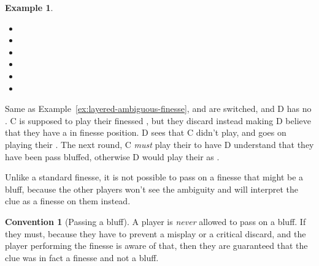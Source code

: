 \documentclass[a4paper]{article}
\theoremstyle{plain}
\theoremstyle{definition}
\newtheorem{example}[theorem]{Example}
\newtheorem{convention}[theorem]{Convention}
\begin{document}
\begin{example}	\hfill \\
	\begin{minipage}{0.45\textwidth}
		\begin{itemize}
			\item[\Large +]      
			\item[\Large A]    
			\item[\Large B]    
			\item[\Large C]     
			\item[\Large D]    
			\item[\Large E]    
		\end{itemize}
	\end{minipage}%
	\begin{minipage}{0.55\textwidth}
		Same as Example~\ref{ex:layered-ambiguous-finesse},  and  are switched, and D has no . C is supposed to play their finessed , but they discard instead making D believe that they have a  in finesse position. D sees that C didn't play, and goes on playing their . The next round, C \emph{must} play their  to have D understand that they have been pass bluffed, otherwise D would play their  as .
	\end{minipage}
\end{example} \vspace{0.15 cm}

Unlike a standard finesse, it is not possible to pass on a finesse that might be a bluff, because the other players won't see the ambiguity and will interpret the clue as a finesse on them instead.

\begin{convention}[Passing a bluff]
	A player is \emph{never} allowed to pass on a bluff. If they must, because they have to prevent a misplay or a critical discard, and the player performing the finesse is aware of that, then they are guaranteed that the clue was in fact a finesse and not a bluff.
\end{convention}
\end{document}
